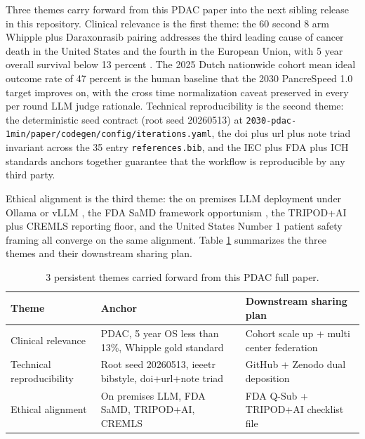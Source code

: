 Three themes carry forward from this PDAC paper into the next
sibling release in this repository. Clinical relevance is the
first theme: the 60 second 8 arm Whipple plus Daraxonrasib pairing
addresses the third leading cause of cancer death in the United
States and the fourth in the European Union, with 5 year overall
survival below 13 percent \cite{Siegel2025CancerStatistics}. The
2025 Dutch nationwide cohort mean ideal outcome rate of 47 percent
\cite{DutchCohort2025Whipple} is the human baseline that the 2030
PancreSpeed 1.0 target improves on, with the cross time
normalization caveat preserved in every per round LLM judge
rationale. Technical reproducibility is the second theme: the
deterministic seed contract (root seed 20260513) at
\texttt{2030-pdac-1min/paper/codegen/config/iterations.yaml}, the
doi plus url plus note triad invariant across the 35 entry
\texttt{references.bib}, and the IEC \cite{iec-80601-2-77,
iec-62304} plus FDA \cite{fda-samd, cfr-21-50-30, rev-fda-breakthrough}
plus ICH \cite{ich-e6r3} standards anchors together guarantee that
the workflow is reproducible by any third party.

Ethical alignment is the third theme: the on premises LLM
deployment under Ollama \cite{ollama} or vLLM \cite{vllm}, the FDA
SaMD framework opportunism \cite{fda-samd}, the TRIPOD+AI
\cite{Collins2024TRIPODAI} plus CREMLS \cite{ElEmam2024CREMLS}
reporting floor, and the United States Number 1 patient safety
framing all converge on the same alignment. Table
\ref{tab:conclusions-themes} summarizes the three themes and
their downstream sharing plan.

\begin{table}[H]
\caption{3 persistent themes carried forward from this PDAC full paper.}
\label{tab:conclusions-themes}
\centering
\begin{tabular}{>{\raggedright\arraybackslash}p{3.4cm} >{\raggedright\arraybackslash}p{4.6cm} >{\raggedright\arraybackslash}p{5.4cm}}
\toprule
\textbf{Theme} & \textbf{Anchor} & \textbf{Downstream sharing plan} \\
\midrule
  Clinical relevance & PDAC, 5 year OS less than 13\%, Whipple gold standard & Cohort scale up + multi center federation \\
  Technical reproducibility & Root seed 20260513, ieeetr bibstyle, doi+url+note triad & GitHub + Zenodo dual deposition \\
  Ethical alignment & On premises LLM, FDA SaMD, TRIPOD+AI, CREMLS & FDA Q-Sub + TRIPOD+AI checklist file \\
\bottomrule
\end{tabular}
\end{table}

